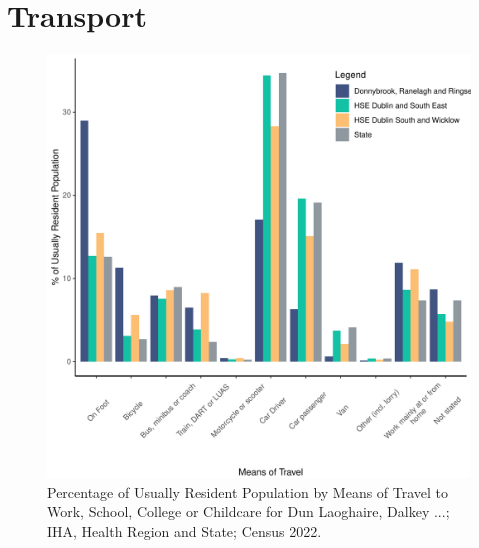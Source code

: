 \documentclass{article}
\begin{document}
\section{Transport}\label{sect:Trans}
\begin{figure}[H]
	\centering
	\includegraphics[width = 120mm]{../figures/TravelED.pdf}
	\caption{Percentage of Usually Resident Population by Means of Travel to Work, School, College or Childcare for Dun Laoghaire, Dalkey ...; IHA, Health Region and State; Census 2022.}
	\label{fig:vbnv}
	\end{figure}
\end{document}
